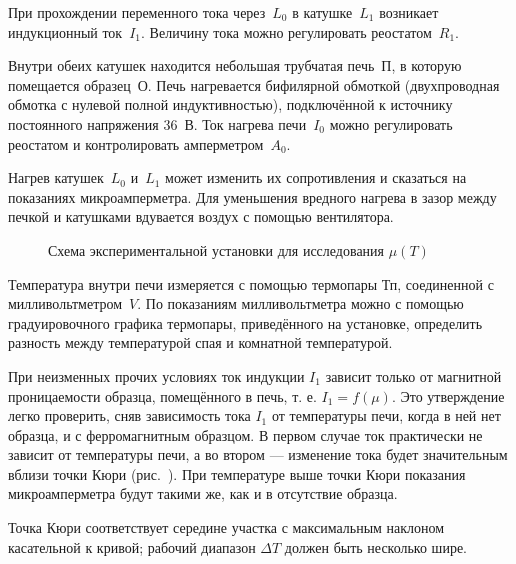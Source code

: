 При прохождении переменного тока через~$L_0$ в катушке~$L_1$ возникает
индукционный ток~$I_1$. Величину тока можно регулировать реостатом~$R_1$.

Внутри обеих катушек находится небольшая трубчатая печь~$\text{П}$, в которую
помещается образец~О. Печь нагревается бифилярной обмоткой
(двухпроводная обмотка с нулевой полной индуктивностью),
подключённой к источнику постоянного напряжения 36~В. Ток нагрева печи~$I_0$
можно регулировать реостатом и контролировать амперметром~$A_0$.

Нагрев катушек~$L_0$ и~$L_1$ может изменить их сопротивления и сказаться на
показаниях микроамперметра. Для уменьшения вредного нагрева в зазор между 
печкой и катушками вдувается воздух с помощью вентилятора.

\begin{figure}[h!]
    \centering\small
    \caption{Схема экспериментальной установки для исследования $\mu(T)$}
\end{figure}

Температура внутри печи измеряется с помощью термопары $\text{Тп}$, соединенной
с милливольтметром~$V$. По показаниям милливольтметра можно с помощью 
градуировочного графика термопары, приведённого на установке, 
определить разность между температурой спая и комнатной
температурой.

При неизменных прочих условиях ток индукции $I_1$ зависит только от магнитной
проницаемости образца, помещённого в печь, т. е. $I_1 = f(\mu)$. Это
утверждение легко проверить, сняв зависимость тока $I_1$ от температуры печи,
когда в ней нет образца, и с ферромагнитным образцом. В первом случае ток
практически не зависит от температуры печи, а во втором --- изменение тока будет
значительным вблизи точки Кюри (рис.~). При температуре выше точки Кюри показания микроамперметра будут
такими же, как и в отсутствие образца.

Точка Кюри соответствует середине участка с максимальным наклоном касательной к
кривой; рабочий диапазон $\Delta T$ должен быть несколько шире.

